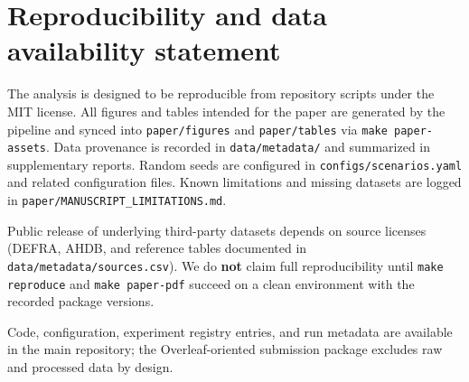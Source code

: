 \section{Reproducibility and data availability statement}
\label{sec:reproducibility}

The analysis is designed to be reproducible from repository scripts under the MIT license.
All figures and tables intended for the paper are generated by the \copper{} pipeline and
synced into \texttt{paper/figures} and \texttt{paper/tables} via \texttt{make paper-assets}.
Data provenance is recorded in \texttt{data/metadata/} and summarized in supplementary reports.
Random seeds are configured in \texttt{configs/scenarios.yaml} and related configuration files.
Known limitations and missing datasets are logged in \texttt{paper/MANUSCRIPT\_LIMITATIONS.md}.

Public release of underlying third-party datasets depends on source licenses (DEFRA, AHDB, and
reference tables documented in \texttt{data/metadata/sources.csv}).
We do \textbf{not} claim full reproducibility until \texttt{make reproduce} and
\texttt{make paper-pdf} succeed on a clean environment with the recorded package versions.

Code, configuration, experiment registry entries, and run metadata are available in the main
\copper{} repository; the Overleaf-oriented submission package excludes raw and processed data
by design.
